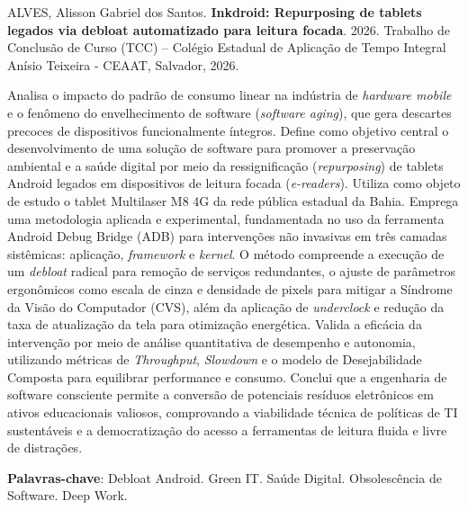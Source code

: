 \documentclass[
    12pt,
    openright,
    oneside,
    a4paper,
    english,
    brazilian
    ]{abntex2}
\begin{document}
\begin{resumo}
\noindent ALVES, Alisson Gabriel dos Santos. \textbf{Inkdroid: Repurposing de tablets legados via debloat automatizado para leitura focada}. 2026. Trabalho de Conclusão de Curso (TCC) -- Colégio Estadual de Aplicação de Tempo Integral Anísio Teixeira - CEAAT, Salvador, 2026.

\vspace{\onelineskip}

Analisa o impacto do padrão de consumo linear na indústria de \textit{hardware mobile} e o fenômeno do envelhecimento de software (\textit{software aging}), que gera descartes precoces de dispositivos funcionalmente íntegros. Define como objetivo central o desenvolvimento de uma solução de software para promover a preservação ambiental e a saúde digital por meio da ressignificação (\textit{repurposing}) de tablets Android legados em dispositivos de leitura focada (\textit{e-readers}). Utiliza como objeto de estudo o tablet Multilaser M8 4G da rede pública estadual da Bahia. Emprega uma metodologia aplicada e experimental, fundamentada no uso da ferramenta Android Debug Bridge (ADB) para intervenções não invasivas em três camadas sistêmicas: aplicação, \textit{framework} e \textit{kernel}. O método compreende a execução de um \textit{debloat} radical para remoção de serviços redundantes, o ajuste de parâmetros ergonômicos como escala de cinza e densidade de pixels para mitigar a Síndrome da Visão do Computador (CVS), além da aplicação de \textit{underclock} e redução da taxa de atualização da tela para otimização energética. Valida a eficácia da intervenção por meio de análise quantitativa de desempenho e autonomia, utilizando métricas de \textit{Throughput}, \textit{Slowdown} e o modelo de Desejabilidade Composta para equilibrar performance e consumo. Conclui que a engenharia de software consciente permite a conversão de potenciais resíduos eletrônicos em ativos educacionais valiosos, comprovando a viabilidade técnica de políticas de TI sustentáveis e a democratização do acesso a ferramentas de leitura fluida e livre de distrações.

\vspace{\onelineskip}
\noindent \textbf{Palavras-chave}: Debloat Android. Green IT. Saúde Digital. Obsolescência de Software. Deep Work.
\end{resumo}
\end{document}
